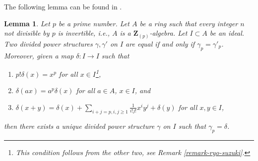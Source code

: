 \documentclass{stacks-project}
\theoremstyle{plain}
\newtheorem{lemma}[subsection]{Lemma}
\theoremstyle{definition}
\theoremstyle{remark}
\numberwithin{equation}{subsection}
\begin{document}
\noindent
The following lemma can be found in \cite{BO}.

\begin{lemma}
\label{lemma-need-only-gamma-p}
Let $p$ be a prime number. Let $A$ be a ring such that every integer $n$
not divisible by $p$ is invertible, i.e., $A$ is a $\mathbf{Z}_{(p)}$-algebra.
Let $I \subset A$ be an ideal. Two divided power structures
$\gamma, \gamma'$ on $I$ are equal if and only if $\gamma_p = \gamma'_p$.
Moreover, given a map $\delta : I \to I$ such that
\begin{enumerate}
\item $p!\delta(x) = x^p$ for all $x \in I$\footnote{This condition
follows from the other two, see Remark \ref{remark-ryo-suzuki}.},
\item $\delta(ax) = a^p\delta(x)$ for all $a \in A$, $x \in I$, and
\item
$\delta(x + y) =
\delta(x) +
\sum\nolimits_{i + j = p, i,j \geq 1} \frac{1}{i!j!} x^i y^j +
\delta(y)$ for all $x, y \in I$,
\end{enumerate}
then there exists a unique divided power structure $\gamma$ on $I$ such
that $\gamma_p = \delta$.
\end{lemma}
\end{document}
